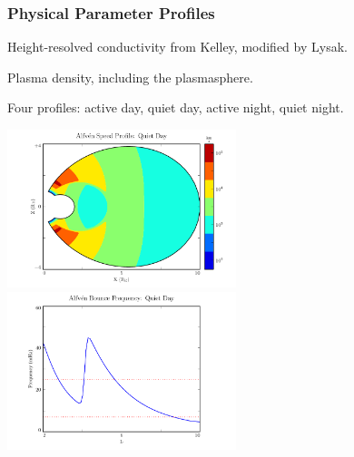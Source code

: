 \documentclass{beamer}
\begin{document}
\begin{frame}
\frametitle{Physical Parameter Profiles}

\begin{wideitemize}
\item Height-resolved conductivity from Kelley, modified by Lysak. 
\item Plasma density, including the plasmasphere. 
\item Four profiles: active day, quiet day, active night, quiet night. 
\end{wideitemize}

\vfill

\includegraphics[width=0.5\textwidth]{figures/va_2.pdf}%
\includegraphics[width=0.5\textwidth]{figures/fa_2.pdf}%

\end{frame}

\end{document}
